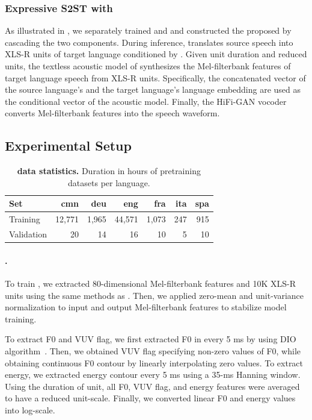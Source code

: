 \subsubsection{Expressive S2ST with \seamlessexpressive}
As illustrated in , we separately trained \prosodyunitytwo and \ptv and constructed the proposed \seamlessexpressive by cascading the two components.
During inference, \prosodyunitytwo translates source speech into XLS-R units of target language conditioned by \ptvemb.
Given unit duration and reduced units, the textless acoustic model of \ptv synthesizes the Mel-filterbank features of target language speech from XLS-R units.
Specifically, the concatenated vector of the source language's \ptvemb and the target language's language embedding are used as the conditional vector of the acoustic model.
Finally, the HiFi-GAN vocoder~\citep{kong2020hifi} converts Mel-filterbank features into the speech waveform.


\subsection{Experimental Setup}

\begin{table}
    \centering
    \begin{tabular}{lrrrrrr}
    \toprule
        \textbf{Set} & \textbf{cmn}       & \textbf{deu}       & \textbf{eng}       & \textbf{fra}       & \textbf{ita}   & \textbf{spa}  \\ \midrule
      Training & 12,771 & 1,965  & 44,571 & 1,073  & 247  & 915  \\
      Validation   &  20   &   14   &  16    &  10     & 5  &  10  \\
    \bottomrule
    \end{tabular}
    \caption{\textbf{\ptv data statistics.} Duration in hours of \ptv pretraining datasets per language.}
    \label{tab:ptv_pretrain_data}
\end{table}

\paragraph{\ptv.}
To train \ptv, we extracted 80-dimensional Mel-filterbank features and 10K XLS-R units using the same methods as \mfourttwo.
Then, we applied zero-mean and unit-variance normalization to input and output Mel-filterbank features to stabilize model training.

To extract F0 and VUV flag, we first extracted F0 in every 5 ms by using DIO algorithm~\citep{morise2016world}.
Then, we obtained VUV flag specifying non-zero values of F0, while obtaining continuous F0 contour by linearly interpolating zero values.
To extract energy, we extracted energy contour every 5 ms using a 35-ms Hanning window.
Using the duration of unit, all F0, VUV flag, and energy features were averaged to have a reduced unit-scale.
Finally, we converted linear F0 and energy values into log-scale.

